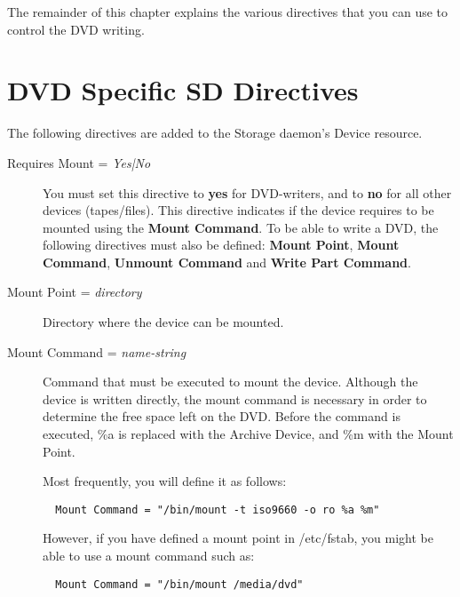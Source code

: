 The remainder of this chapter explains the various directives that you can
use to control the DVD writing.

\label{DVDdirectives}
\section{DVD Specific SD Directives} 

The following directives are added to the Storage daemon's
Device resource.

\begin{description}

\item [Requires Mount = {\it Yes|No}]
   You must set this directive to {\bf yes} for DVD-writers,  and to {\bf no} for
   all other devices (tapes/files).  This directive indicates if the device
   requires to be mounted using the {\bf Mount Command}.
   To be able to write a DVD, the following directives must also be
   defined: {\bf Mount Point},  {\bf Mount Command}, {\bf Unmount Command} and
   {\bf Write Part Command}.

\item [Mount Point = {\it directory}]
   Directory where the device can be mounted. 

\item [Mount Command = {\it name-string}]
   Command that must be executed to mount the device. Although the
   device is written directly, the mount command is necessary in
   order to determine the free space left on the DVD. Before the command is 
   executed, \%a is replaced with the Archive Device, and \%m with the Mount 
   Point.

   Most frequently, you will define it as follows:  

\footnotesize
\begin{verbatim}
  Mount Command = "/bin/mount -t iso9660 -o ro %a %m"
\end{verbatim}
\normalsize

However, if you have defined a mount point in /etc/fstab, you might be
able to use a mount command such as:

\footnotesize
\begin{verbatim}
  Mount Command = "/bin/mount /media/dvd"
\end{verbatim}
\normalsize



\end{description}
